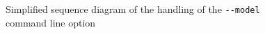 \documentclass[a4paper]{article}
\begin{document}
	\begin{figure}[ht]
	\centering
	\caption{Simplified sequence diagram of the handling of the \lstinline{--model} command line option}
	\label{fig:sd_client_model}
	\end{figure}
	
\end{document}
